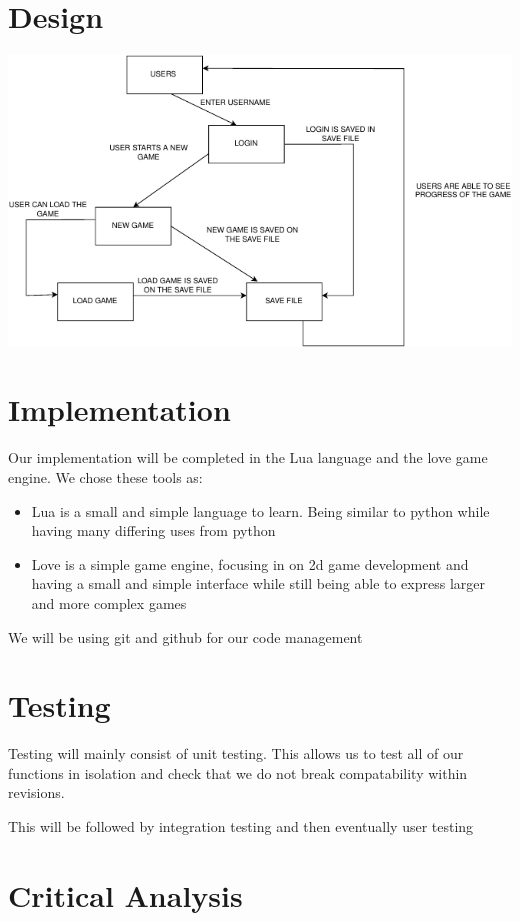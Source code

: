 \documentclass{article}
\begin{document}
\section{Design}%
\label{sec:deign}
\includegraphics[scale=1,page=1]{2DGAME.drawio-crop.pdf}
\newpage
\section{Implementation}%
\label{sec:impl}
Our implementation will be completed in the Lua language and the love game
engine. We chose these tools as:
\begin{itemize}
	\item Lua is a small and simple language to learn. Being similar to python while
	      having many differing uses from python
	\item Love is a simple game engine, focusing in on 2d game development and
	      having a small and simple interface while still being able to express
	      larger and more complex games
\end{itemize}

We will be using git and github for our code management
\section{Testing}%
\label{sec:test}
Testing will mainly consist of unit testing. This allows us to test all of our
functions in isolation and check that we do not break compatability within
revisions.

This will be followed by integration testing and then eventually user testing
\newpage
\section{Critical Analysis}%
\label{sec:anal}
\end{document}
